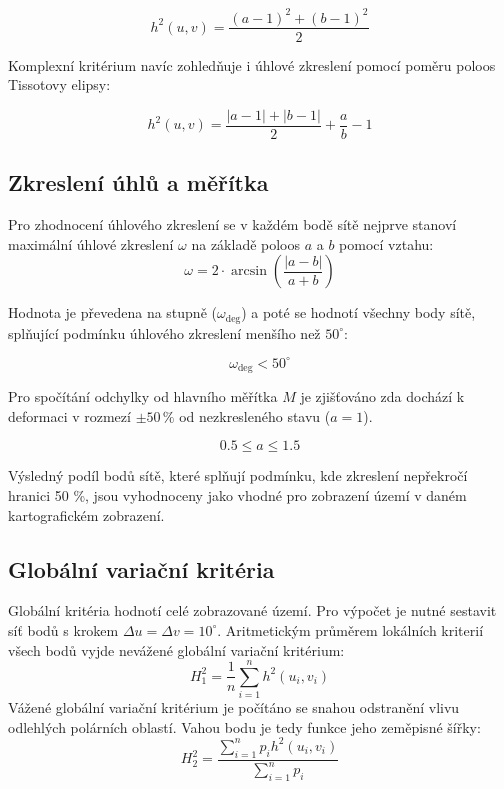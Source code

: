 \documentclass[12pt, a4paper]{article}
\begin{document}
\vspace{3mm}
\[
h^{2}(u,v) = \frac{(a-1)^{2}+(b-1)^{2}}{2}
\]

\vspace{3mm}
\noindent Komplexní kritérium navíc zohledňuje i úhlové zkreslení pomocí poměru poloos Tissotovy elipsy:
\vspace{3mm}

\[
h^{2}(u,v) = \frac{|a-1|+|b-1|}{2}+\frac{a}{b}-1
\]
\vspace{3mm}

\subsection*{Zkreslení úhlů a měřítka}
\noindent Pro zhodnocení úhlového zkreslení se v každém bodě sítě nejprve stanoví maximální úhlové zkreslení $\omega$ na základě poloos $a$ a $b$ pomocí vztahu:
\vspace{3mm}
\[
\omega = 2 \cdot \arcsin \left( \frac{|a - b|}{a + b} \right)
\]
\vspace{3mm}

\noindent Hodnota je převedena na stupně ($\omega_{\text{deg}}$) a poté se hodnotí všechny body sítě, splňující podmínku úhlového zkreslení menšího než $50^\circ$:

\vspace{3mm}
\[
\omega_{\text{deg}} < 50^\circ
\]

\vspace{3mm}
\noindent Pro spočítání odchylky od hlavního měřítka $M$ je zjišťováno zda dochází k deformaci v rozmezí $\pm 50\,\%$ od nezkresleného stavu ($a = 1$).
\vspace{3mm}

\[
0.5 \le a \le 1.5
\]

\vspace{3mm}
\noindent Výsledný podíl bodů sítě, které splňují podmínku, kde zkreslení nepřekročí hranici 50 \%, jsou vyhodnoceny jako vhodné pro zobrazení území v daném kartografickém zobrazení.

\subsection*{Globální variační kritéria}
Globální kritéria hodnotí celé zobrazované území. Pro výpočet je nutné sestavit síť bodů s krokem $\Delta u = \Delta v = 10^\circ$. Aritmetickým průměrem lokálních kriterií všech bodů vyjde nevážené globální variační kritérium:
\vspace{3mm}
\[
H_{1}^{2} = \frac{1}{n}\sum_{i=1}^{n}h^{2}(u_{i},v_{i})
\]
\vspace{3mm}
Vážené globální variační kritérium je počítáno se snahou odstranění vlivu odlehlých polárních oblastí. Vahou bodu je tedy funkce jeho zeměpisné šířky:
\vspace{3mm}
\[
H_{2}^{2} = \frac{\sum_{i=1}^{n}p_{i}h^{2}(u_{i},v_{i})}{\sum_{i=1}^{n}p_{i}}
\]
\end{document}
